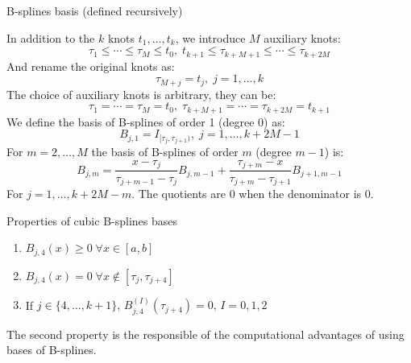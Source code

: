 \begin{definition}{B-splines basis}{} (defined recursively)

    In addition to the $k$ knots $t_1,\ldots,t_k$, we introduce $M$ auxiliary
    knots:
    \begin{equation*}
        \tau_1 \leq \cdots \leq \tau_M \leq t_0,\;
        t_{k+1} \leq \tau_{k+M+1} \leq \cdots \leq \tau_{k+2M}
    \end{equation*}
    And rename the original knots as:
    \begin{equation*}
        \tau_{M+j} = t_j,\; j=1,\ldots,k
    \end{equation*}
    The choice of auxiliary knots is arbitrary, they can be:
    \begin{equation*}
        \tau_1=\cdots=\tau_M = t_0,\; \tau_{k+M+1}=\cdots=\tau_{k+2M} = t_{k+1}
    \end{equation*}
    We define the basis of B-splines of order 1 (degree 0) as:
    \begin{equation*}
        B_{j,1} = I_{[\tau_j,\tau_{j+1})},\; j=1,\ldots,k+2M - 1
    \end{equation*}
    For $m=2,\ldots,M$ the basis of B-splines of order $m$ (degree $m-1$) is:
    \begin{equation*}
        B_{j,m} = \frac{x-\tau_j}{\tau_{j+m-1}-\tau_j}B_{j,m-1}
        + \frac{\tau_{j+m}-x}{\tau_{j+m}-\tau_{j+1}}B_{j+1,m-1}
    \end{equation*}
    For $j=1,\ldots,k+2M-m$. The quotients are 0 when the denominator is 0.
\end{definition}

\begin{example}{Properties of cubic B-splines bases}{}
    \begin{enumerate}
        \item $B_{j,4}(x) \geq 0\; \forall x \in [a,b]$
        \item $B_{j,4}(x) = 0\; \forall x \notin [\tau_j,\tau_{j+4}]$
        \item If $j \in \{4,\ldots,k+1\},\, B_{j,4}^{(I)}(\tau_{j+4}) = 0,\,I=0,1,2$
    \end{enumerate}
    The second property is the responsible of the computational advantages
    of using bases of B-splines.
\end{example}

